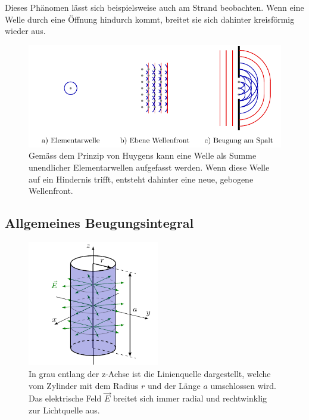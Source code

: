 Dieses Phänomen lässt sich beispielsweise auch am Strand beobachten. 
Wenn eine Welle durch eine Öffnung hindurch kommt, breitet sie sich dahinter kreisförmig wieder aus.

\begin{figure}
    \centering
    \includegraphics[width=120mm]{papers/opt/images/huygens.pdf}
    \caption{Gemäss dem Prinzip von Huygens kann eine Welle als Summe unendlicher Elementarwellen aufgefasst werden.
    Wenn diese Welle auf ein Hindernis trifft, entsteht dahinter eine neue, gebogene Wellenfront.}
    \label{opt:fig:huygens}
\end{figure}

\subsection{Allgemeines Beugungsintegral}

\begin{figure}
    \centering
    \includegraphics[width=57.34mm]{papers/opt/images/maxwell.pdf}
    \caption{In grau entlang der z-Achse ist die Linienquelle dargestellt, welche vom Zylinder mit dem Radius $r$ und der Länge $a$ umschlossen wird.
    Das elektrische Feld $\vec{E}$ breitet sich immer radial und rechtwinklig zur Lichtquelle aus.}
    \label{opt:fig:maxwell}
\end{figure}

